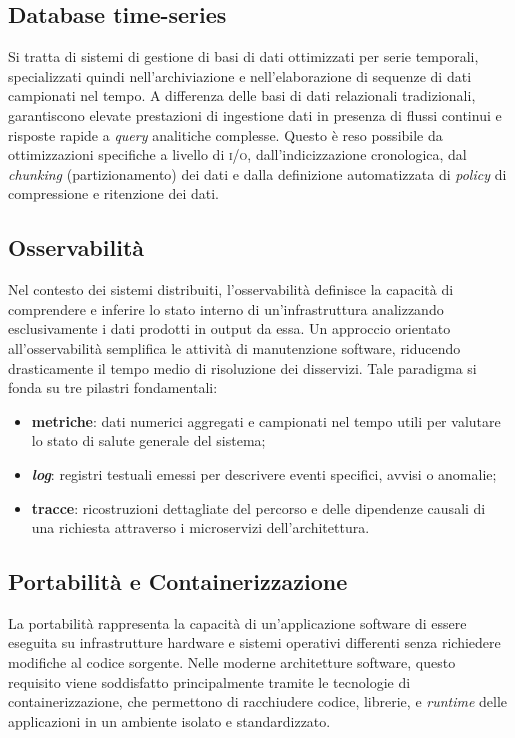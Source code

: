 \documentclass[12pt]{article}
\begin{document}
    \subsection{Database time-series}
    
    Si tratta di sistemi di gestione di basi di dati ottimizzati per serie temporali, specializzati quindi nell'archiviazione e nell'elaborazione di sequenze di dati campionati nel tempo. 
    A differenza delle basi di dati relazionali tradizionali, garantiscono elevate prestazioni di ingestione dati in presenza di flussi continui e risposte rapide a \textit{query} analitiche complesse. Questo è reso possibile da ottimizzazioni specifiche a livello di \textsc{i/o}, dall'indicizzazione cronologica, dal \textit{chunking} (partizionamento) dei dati e dalla definizione automatizzata di \textit{policy} di compressione e ritenzione dei dati.
    
    \subsection{Osservabilità}
    
    Nel contesto dei sistemi distribuiti, l'osservabilità definisce la capacità di comprendere e inferire lo stato interno di un'infrastruttura analizzando esclusivamente i dati prodotti in output da essa. 
    Un approccio orientato all'osservabilità semplifica le attività di manutenzione software, riducendo drasticamente il tempo medio di risoluzione dei disservizi. Tale paradigma si fonda su tre pilastri fondamentali:
    \begin{itemize}
        \item \textbf{metriche}: dati numerici aggregati e campionati nel tempo utili per valutare lo stato di salute generale del sistema;
        \item \textbf{\textit{log}}: registri testuali emessi per descrivere eventi specifici, avvisi o anomalie;
        \item \textbf{tracce}: ricostruzioni dettagliate del percorso e delle dipendenze causali di una richiesta attraverso i microservizi dell'architettura.
    \end{itemize}

    \subsection{Portabilità e Containerizzazione}
    
    La portabilità rappresenta la capacità di un'applicazione software di essere eseguita su infrastrutture hardware e sistemi operativi differenti senza richiedere modifiche al codice sorgente. Nelle moderne architetture software, questo requisito viene soddisfatto principalmente tramite le tecnologie di containerizzazione, che permettono di racchiudere codice, librerie, e \textit{runtime} delle applicazioni in un ambiente isolato e standardizzato.
    
\end{document}
